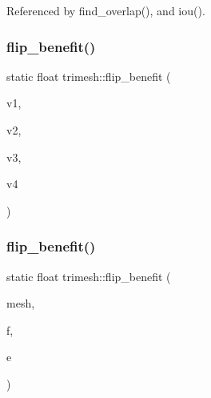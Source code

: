 Referenced by find\+\_\+overlap(), and iou().

\mbox{\label{namespacetrimesh_a5904077afc65b3f3fb7eaf9050af9943}} 
\subsubsection{\texorpdfstring{flip\+\_\+benefit()}{flip\_benefit()}\hspace{0.1cm}{\footnotesize\ttfamily [1/2]}}
{\footnotesize\ttfamily static float trimesh\+::flip\+\_\+benefit (\begin{DoxyParamCaption}\item[{const \hyperlink{namespacetrimesh_a325b99fd6454b22fa4c4bc3223271b2c}{point} \&}]{v1,  }\item[{const \hyperlink{namespacetrimesh_a325b99fd6454b22fa4c4bc3223271b2c}{point} \&}]{v2,  }\item[{const \hyperlink{namespacetrimesh_a325b99fd6454b22fa4c4bc3223271b2c}{point} \&}]{v3,  }\item[{const \hyperlink{namespacetrimesh_a325b99fd6454b22fa4c4bc3223271b2c}{point} \&}]{v4 }\end{DoxyParamCaption})\hspace{0.3cm}{\ttfamily [static]}}

\mbox{\label{namespacetrimesh_aa1e813778d2fe154974bce5a6aca7488}} 
\subsubsection{\texorpdfstring{flip\+\_\+benefit()}{flip\_benefit()}\hspace{0.1cm}{\footnotesize\ttfamily [2/2]}}
{\footnotesize\ttfamily static float trimesh\+::flip\+\_\+benefit (\begin{DoxyParamCaption}\item[{const \hyperlink{classtrimesh_1_1TriMesh}{Tri\+Mesh} $\ast$}]{mesh,  }\item[{int}]{f,  }\item[{int}]{e }\end{DoxyParamCaption})\hspace{0.3cm}{\ttfamily [static]}}



